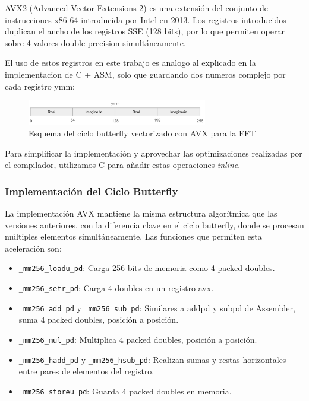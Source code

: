 \documentclass[a4paper]{article}
\begin{document}
AVX2 (Advanced Vector Extensions 2) es una extensión del conjunto de instrucciones x86-64 introducida por Intel en 2013. Los registros introducidos duplican el ancho
de los registros SSE (128 bits), por lo que permiten operar sobre 4 valores double precision simultáneamente.

El uso de estos registros en este trabajo es analogo al explicado en la implementacion de C + ASM, solo que guardando dos numeros complejo por cada registro ymm:

\begin{figure}[h]
    \centering
    \includegraphics[width=0.7\textwidth]{extra/ymm complex.png}
    \caption{Esquema del ciclo butterfly vectorizado con AVX para la FFT}
    \label{fig:avx_butterfly}
\end{figure}

Para simplificar la implementación y aprovechar las optimizaciones realizadas por el compilador, utilizamos C para añadir estas operaciones \textit{inline}.

\subsubsection{Implementación del Ciclo Butterfly}

La implementación AVX mantiene la misma estructura algorítmica que las versiones anteriores, con la diferencia clave en el ciclo butterfly, donde se procesan
múltiples elementos simultáneamente. Las funciones que permiten esta aceleración son:
\begin{itemize}
    \item \texttt{\_mm256\_loadu\_pd}: Carga 256 bits de memoria como 4 packed doubles.
    \item \texttt{\_mm256\_setr\_pd}: Carga 4 doubles en un registro avx.
    \item \texttt{\_mm256\_add\_pd} y \texttt{\_mm256\_sub\_pd}: Similares a addpd y subpd de Assembler, suma 4 packed doubles, posición a posición.
    \item \texttt{\_mm256\_mul\_pd}: Multiplica 4 packed doubles, posición a posición.
    \item \texttt{\_mm256\_hadd\_pd} y \texttt{\_mm256\_hsub\_pd}: Realizan sumas y restas horizontales entre pares de elementos del registro.
    \item \texttt{\_mm256\_storeu\_pd}: Guarda 4 packed doubles en memoria.
\end{itemize}
\end{document}

